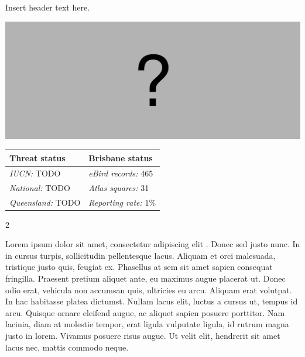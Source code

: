 \documentclass[12pt,openany,oneside]{book}
\let\origfigure\figure
\let\endorigfigure\endfigure
\renewenvironment{figure}[1][2] {
  \expandafter\origfigure\expandafter[H]
} {
  \endorigfigure
}
\let\Begin\begin
\let\End\end
\theoremstyle{definition}
\theoremstyle{definition}
\theoremstyle{definition}
\theoremstyle{remark}
\begin{document}

Insert header text here.

\begin{figure}
\centering
\includegraphics[width=\textwidth,keepaspectratio=true]{assets/misc/missing-profile.png}
\caption{Insert caption here.}
\end{figure}

\begin{tabu} to 
\toprule
Threat status & Brisbane status\\
\midrule
\textit{IUCN:} TODO & \textit{eBird records:} 465\\
\textit{National:} TODO & \textit{Atlas squares:} 31\\
\textit{Queensland:} TODO & \textit{Reporting rate:} 1\%\\
\bottomrule
\end{tabu} 
\vspace{0.15cm}

\Begin{multicols}{2}

Lorem ipsum dolor sit amet, consectetur adipiscing elit
\citep{rexample1, rexample2, rexample3}. Donec sed justo nunc. In in
cursus turpis, sollicitudin pellentesque lacus. Aliquam et orci
malesuada, tristique justo quis, feugiat ex. Phasellus at sem sit amet
sapien consequat fringilla. Praesent pretium aliquet ante, eu maximus
augue placerat ut. Donec odio erat, vehicula non accumsan quis,
ultricies eu arcu. Aliquam erat volutpat. In hac habitasse platea
dictumst. Nullam lacus elit, luctus a cursus ut, tempus id arcu. Quisque
ornare eleifend augue, ac aliquet sapien posuere porttitor. Nam lacinia,
diam at molestie tempor, erat ligula vulputate ligula, id rutrum magna
justo in lorem. Vivamus posuere risus augue. Ut velit elit, hendrerit
sit amet lacus nec, mattis commodo neque.

\End{multicols}

\clearpage
\end{document}
